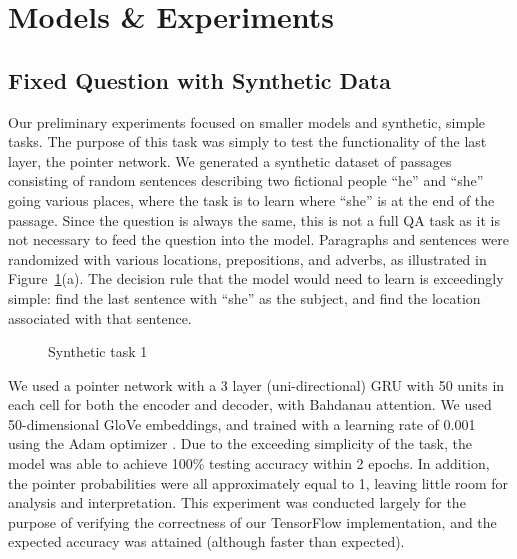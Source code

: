 \documentclass{article}
\begin{document}
\section{Models \& Experiments} \label{model}

\subsection{Fixed Question with Synthetic Data}
Our preliminary experiments focused on smaller models and synthetic, simple tasks. The purpose of this task was simply to test the functionality of the last layer, the pointer network. We generated a synthetic dataset of passages consisting of random sentences describing two fictional people ``he'' and ``she'' going various places, where the task is to learn where ``she'' is at the end of the passage. Since the question is always the same, this is not a full QA task as it is not necessary to feed the question into the model. Paragraphs and sentences were randomized with various locations, prepositions, and adverbs, as illustrated in Figure~\ref{fig:fakeData1}(a). The decision rule that the model would need to learn is exceedingly simple: find the last sentence with ``she'' as the subject, and find the location associated with that sentence.

\begin{figure}[h]
	\centering
	\qquad
	\caption{Synthetic task 1}
	\label{fig:fakeData1}
\end{figure}

We used a pointer network with a 3 layer (uni-directional) GRU with 50 units in each cell for both the encoder and decoder, with Bahdanau attention. We used 50-dimensional GloVe embeddings, and trained with a learning rate of 0.001 using the Adam optimizer \cite{Adam}. Due to the exceeding simplicity of the task, the model was able to achieve 100\% testing accuracy within 2 epochs. In addition, the pointer probabilities were all approximately equal to 1, leaving little room for analysis and interpretation. This experiment was conducted largely for the purpose of verifying the correctness of our TensorFlow implementation, and the expected accuracy was attained (although faster than expected).  
\end{document}
